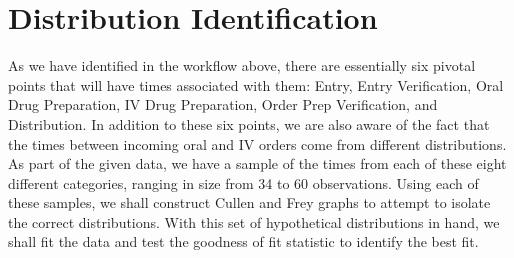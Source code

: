 \documentclass[10pt]{report}            %
\begin{document}
\section*{Distribution Identification}
As we have identified in the workflow above, there are essentially six pivotal points that will have times associated with them: Entry, Entry Verification, Oral Drug Preparation, IV Drug Preparation, Order Prep Verification, and Distribution. In addition to these six points, we are also aware of the fact that the times between incoming oral and IV orders come from different distributions. As part of the given data, we have a sample of the times from each of these eight different categories, ranging in size from 34 to 60 observations. Using each of these samples, we shall construct Cullen and Frey graphs to attempt to isolate the correct distributions. With this set of hypothetical distributions in hand, we shall fit the data and test the goodness of fit statistic to identify the best fit.
\end{document}
